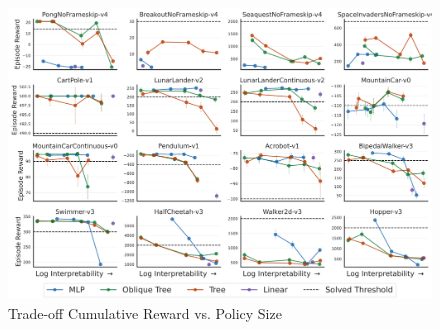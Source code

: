 \begin{figure}[ht]
    \centering
    \includegraphics[width=0.95\linewidth]{images/images_part3/trade_off_size.pdf}
    \caption{Trade-off Cumulative Reward vs. Policy Size}
    \label{fig:trade-off-size}
\end{figure}